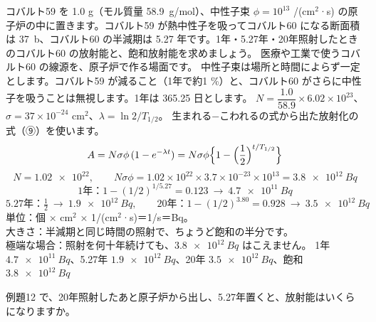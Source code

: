 \label{ph:原-13:ex12}
\begin{phreidai}
コバルト59 を 1.0 g（モル質量 \qty{58.9}{g/mol}）、中性子束 $\phi=10^{13}$ /(cm$^2$·s) の原子炉の中に置きます。コバルト59 が熱中性子を吸ってコバルト60 になる断面積は \qty{37}{b}、コバルト60 の半減期は 5.27 年です。1年・5.27年・20年照射したときのコバルト60 の放射能と、飽和放射能を求めましょう。
\phbamen
医療や工業で使うコバルト60 の線源を、原子炉で作る場面です。
\phmushi
中性子束は場所と時間によらず一定とします。コバルト59 が減ること（1年で約1 \%）と、コバルト60 がさらに中性子を吸うことは無視します。1年は 365.25 日とします。
\phzu
$N=\dfrac{1.0}{58.9}\times6.02\times10^{23}$、$\sigma=37\times10^{-24}$ cm$^2$、$\lambda=\ln2/T_{1/2}$。
\phriyu
生まれる−こわれるの式から出た放射化の式（⑨）を使います。
\phtateru
\[ A=N\sigma\phi\,(1-e^{-\lambda t})=N\sigma\phi\Bigl\{1-\Bigl(\frac12\Bigr)^{t/T_{1/2}}\Bigr\} \]
\phtoku
\[ N=\num{1.02e22},\qquad N\sigma\phi=1.02\times10^{22}\times3.7\times10^{-23}\times10^{13}=\qty{3.8e12}{Bq} \]
\[ 1\text{年}：1-(1/2)^{1/5.27}=0.123\ \to\ \qty{4.7e11}{Bq} \]
\[ 5.27\text{年}：\tfrac12\ \to\ \qty{1.9e12}{Bq},\qquad 20\text{年}：1-(1/2)^{3.80}=0.928\ \to\ \qty{3.5e12}{Bq} \]
\phtashikame
単位：個 × cm$^2$ × 1/(cm$^2$·s)＝1/s＝Bq。\\
大きさ：半減期と同じ時間の照射で、ちょうど飽和の半分です。\\
極端な場合：照射を何十年続けても、$\qty{3.8e12}{Bq}$ はこえません。
\kotae 1年 $\qty{4.7e11}{Bq}$、5.27年 $\qty{1.9e12}{Bq}$、20年 $\qty{3.5e12}{Bq}$、飽和 $\qty{3.8e12}{Bq}$
\end{phreidai}
\begin{jibun}
例題12 で、20年照射したあと原子炉から出し、5.27年置くと、放射能はいくらになりますか。
\end{jibun}

